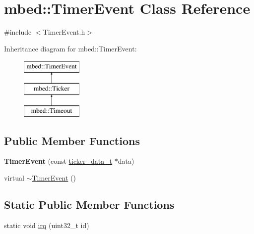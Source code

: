 \hypertarget{classmbed_1_1_timer_event}{}\section{mbed\+:\+:Timer\+Event Class Reference}
\label{classmbed_1_1_timer_event}


{\ttfamily \#include $<$Timer\+Event.\+h$>$}

Inheritance diagram for mbed\+:\+:Timer\+Event\+:\begin{figure}[H]
\begin{center}
\leavevmode
\includegraphics[height=3.000000cm]{classmbed_1_1_timer_event}
\end{center}
\end{figure}
\subsection*{Public Member Functions}
\begin{DoxyCompactItemize}
\item 
{\bfseries Timer\+Event} (const \hyperlink{structticker__data__t}{ticker\+\_\+data\+\_\+t} $\ast$data)\hypertarget{classmbed_1_1_timer_event_aa959f84529a056afa2308930ef309810}{}\label{classmbed_1_1_timer_event_aa959f84529a056afa2308930ef309810}

\item 
virtual \hyperlink{classmbed_1_1_timer_event_a6a2a3c2acee5b36ce21e40d84a4f9b71}{$\sim$\+Timer\+Event} ()
\end{DoxyCompactItemize}
\subsection*{Static Public Member Functions}
\begin{DoxyCompactItemize}
\item 
static void \hyperlink{classmbed_1_1_timer_event_a5c57cce06f037a5682fdee29b8dd384e}{irq} (uint32\+\_\+t id)
\end{DoxyCompactItemize}
